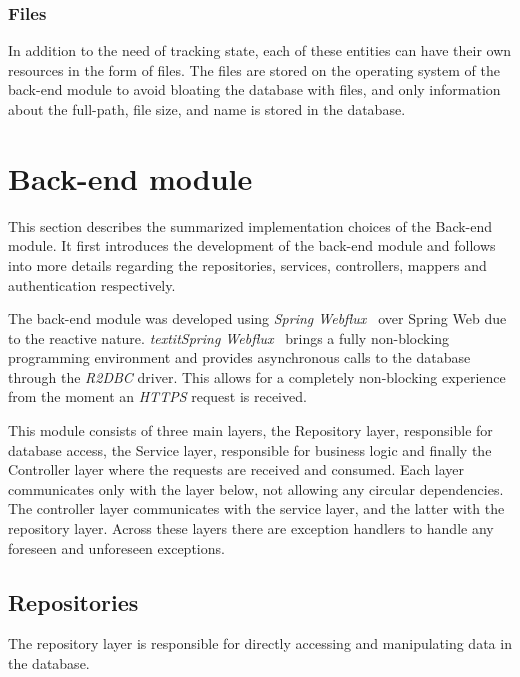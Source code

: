 \subsubsection{Files}\label{subsubsec:files-model}
In addition to the need of tracking state, each of these entities can have their own resources in the form of files.
The files are stored on the operating system of the back-end module to avoid bloating the database with files, and only information about the full-path, file size, and name is stored in the database.


\section{Back-end module}\label{sec:back-end-module}
This section describes the summarized implementation choices of the Back-end module.
It first introduces the development of the back-end module and follows into more details regarding the repositories, services, controllers, mappers and authentication respectively.


The back-end module was developed using \textit{{Spring Webflux}~\cite{spring-webflux}} over Spring Web due to the reactive nature. \textit{textit{Spring Webflux}~\cite{spring-webflux}} brings a fully non-blocking programming environment and provides asynchronous calls to the database through the \textit{R2DBC} driver. This allows for a completely non-blocking experience from the moment an \textit{HTTPS} request is received. 

This module consists of three main layers, the Repository layer, responsible for database access, the Service layer, responsible for business logic and finally the Controller layer where the requests are received and consumed. Each layer communicates only with the layer below, not allowing any circular dependencies. The controller layer communicates with the service layer, and the latter with the repository layer. Across these layers there are exception handlers to handle any foreseen and unforeseen exceptions.


\subsection{Repositories}\label{subsec:repositories}
The repository layer is responsible for directly accessing and manipulating data in the database. 

